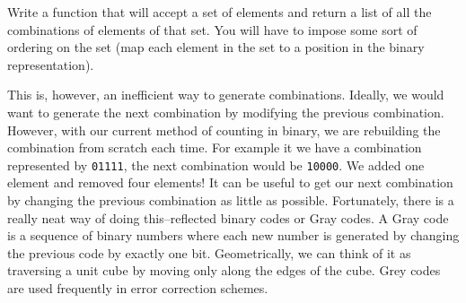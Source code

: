 \begin{problem}
Write a function that will accept a set of elements and return a list of all the combinations
of elements of that set.  You will have to impose some sort of ordering on the set (map each element
in the set to a position in the binary representation).
\end{problem}

This is, however, an inefficient way to generate combinations.  Ideally, we would want
to generate the next combination by modifying the previous combination.  However, with
our current method of counting in binary, we are rebuilding the combination from scratch
each time.  For example it we have a combination represented by \texttt{01111}, the next
combination would be \texttt{10000}.  We added one element and removed four elements!
It can be useful to get our next combination by changing the previous combination as little as possible.
Fortunately, there is a really neat way of doing this--reflected binary codes or Gray codes. 
A Gray code is a sequence of binary numbers where each new number is generated by
changing the previous code by exactly one bit.  Geometrically, we can think of it as
traversing a unit cube by moving only along the edges of the cube.
Grey codes are used frequently in error correction schemes.

